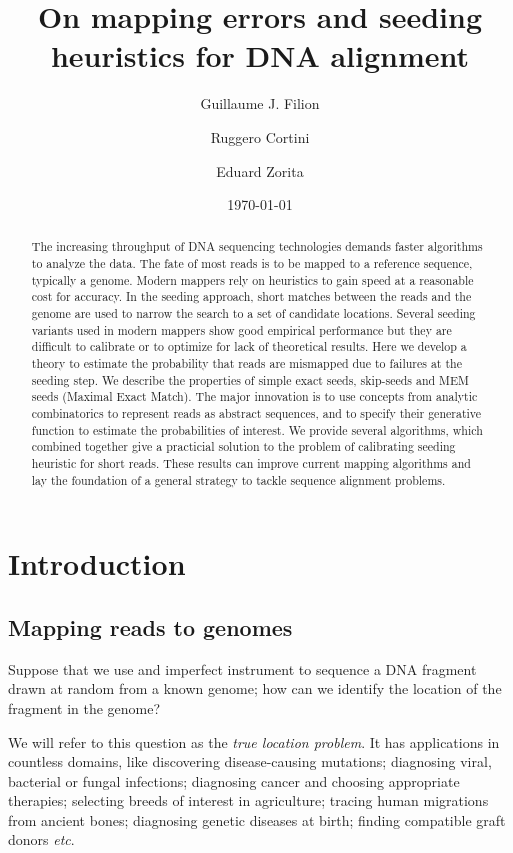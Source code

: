 \documentclass{article}
\title{On mapping errors and seeding heuristics for
DNA alignment}
\author[1,2]{Guillaume J. Filion}
\author[1]{Ruggero Cortini}
\author[1]{Eduard Zorita}
\affil[1]{Center for Genomic Regulation (CRG), The Barcelona Institute of
Science and Technology, Dr. Aiguader 88, Barcelona 08003, Spain.}
\affil[2]{University Pompeu Fabra (UPF), Barcelona, Spain.}
\date{\today}
\begin{document}
\maketitle

\begin{abstract}
The increasing throughput of DNA sequencing technologies demands faster
algorithms to analyze the data. The fate of most reads is to be mapped to
a reference sequence, typically a genome. Modern mappers rely on
heuristics to gain speed at a reasonable cost for accuracy. In the seeding
approach, short matches between the reads and the genome are used to
narrow the search to a set of candidate locations. Several seeding
variants used in modern mappers show good empirical performance but they
are difficult to calibrate or to optimize for lack of theoretical results.
Here we develop a theory to estimate the probability that reads are
mismapped due to failures at the seeding step. We describe the properties
of simple exact seeds, skip-seeds and MEM seeds (Maximal Exact
Match).
The major innovation is to use concepts from analytic combinatorics to
represent reads as abstract sequences, and to specify their generative
function to estimate the probabilities of interest.
We provide several algorithms, which combined together give a practicial
solution to the problem of calibrating seeding heuristic for short reads.
These results can improve current mapping algorithms and lay the
foundation of a general strategy to tackle sequence alignment problems.
\end{abstract}



\section{Introduction}

\subsection{Mapping reads to genomes}

Suppose that we use and imperfect instrument to sequence a DNA fragment
drawn at random from a known genome; how can we identify the location of
the fragment in the genome?

We will refer to this question as the \emph{true location problem}.
It has applications in countless domains, like discovering
disease-causing mutations; diagnosing viral, bacterial or fungal
infections; diagnosing cancer and choosing appropriate therapies;
selecting breeds of interest in agriculture; tracing human migrations from
ancient bones; diagnosing genetic diseases at birth; finding compatible
graft donors \textit{etc}.
\end{document}
